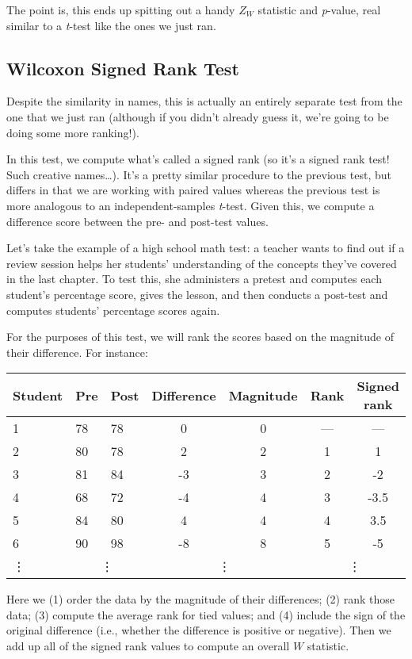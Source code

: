 The point is, this ends up spitting out a handy $Z_W$ statistic and \textit{p}-value, real similar to a \textit{t}-test like the ones we just ran.

\subsection{Wilcoxon Signed Rank Test}

Despite the similarity in names, this is actually an entirely separate test from the one that we just ran (although if you didn't already guess it, we're going to be doing some more ranking!).

In this test, we compute what's called a signed rank (so it's a signed rank test! Such creative names\ldots). It's a pretty similar procedure to the previous test, but differs in that we are working with paired values whereas the previous test is more analogous to an independent-samples \textit{t}-test. Given this, we compute a difference score between the pre- and post-test values.

Let's take the example of a high school math test: a teacher wants to find out if a review session helps her students' understanding of the concepts they've covered in the last chapter. To test this, she administers a pretest and computes each student's percentage score, gives the lesson, and then conducts a post-test and computes students' percentage scores again.

For the purposes of this test, we will rank the scores based on the magnitude of their difference. For instance:

\begin{tabular}{l l l | c c c c}
Student & Pre & Post & Difference & Magnitude & Rank & Signed rank \\
\hline
1 & 78 & 78 & 0 & 0 & --- & --- \\
2 & 80 & 78 & 2 & 2 & 1 & 1 \\
3 & 81 & 84 & -3 & 3 & 2 & -2 \\
4 & 68 & 72 & -4 & 4 & 3 & -3.5 \\
5 & 84 & 80 & 4 & 4 & 4 & 3.5 \\
6 & 90 & 98 & -8 & 8 & 5 & -5 \\
\vdots & \multicolumn{2}{c}{\vdots} & \multicolumn{2}{c}{\vdots} & \multicolumn{2}{c}{\vdots} \\
\end{tabular}

Here we (1) order the data by the magnitude of their differences; (2) rank those data; (3) compute the average rank for tied values; and (4) include the sign of the original difference (i.e., whether the difference is positive or negative). Then we add up all of the signed rank values  to compute  an  overall  $W$  statistic.

